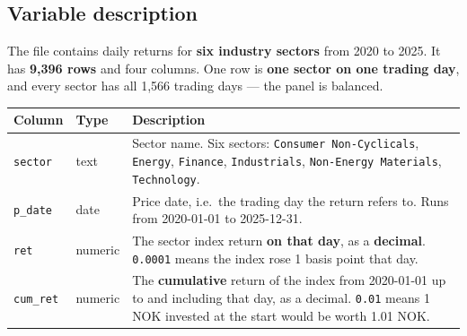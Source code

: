 \documentclass[
  12pt,
  letterpaper,
]{scrbook}
\newenvironment{Shaded}{\begin{snugshade}}{\end{snugshade}}
\newcommand{\AttributeTok}[1]{\textcolor[rgb]{0.40,0.45,0.13}{#1}}
\newcommand{\CommentTok}[1]{\textcolor[rgb]{0.37,0.37,0.37}{#1}}
\newcommand{\ConstantTok}[1]{\textcolor[rgb]{0.56,0.35,0.01}{#1}}
\newcommand{\DecValTok}[1]{\textcolor[rgb]{0.68,0.00,0.00}{#1}}
\newcommand{\FunctionTok}[1]{\textcolor[rgb]{0.28,0.35,0.67}{#1}}
\newcommand{\NormalTok}[1]{\textcolor[rgb]{0.00,0.23,0.31}{#1}}
\newcommand{\OtherTok}[1]{\textcolor[rgb]{0.00,0.23,0.31}{#1}}
\newcommand{\SpecialCharTok}[1]{\textcolor[rgb]{0.37,0.37,0.37}{#1}}
\newcommand{\StringTok}[1]{\textcolor[rgb]{0.13,0.47,0.30}{#1}}
\theoremstyle{plain}
\theoremstyle{definition}
\theoremstyle{remark}
\begin{document}
\begin{Shaded}
\end{Shaded}

\subsection{Variable description}\label{variable-description}

The file contains daily returns for \textbf{six industry sectors} from
2020 to 2025. It has \textbf{9,396 rows} and four columns. One row is
\textbf{one sector on one trading day}, and every sector has all 1,566
trading days --- the panel is balanced.

\begin{longtable}[]{@{}
  >{\raggedright\arraybackslash}p{}
  >{\raggedright\arraybackslash}p{}
  >{\raggedright\arraybackslash}p{}@{}}
\toprule\noalign{}
\begin{minipage}[b]{\linewidth}\raggedright
Column
\end{minipage} & \begin{minipage}[b]{\linewidth}\raggedright
Type
\end{minipage} & \begin{minipage}[b]{\linewidth}\raggedright
Description
\end{minipage} \\
\midrule\noalign{}
\endhead
\bottomrule\noalign{}
\endlastfoot
\texttt{sector} & text & Sector name. Six sectors:
\texttt{Consumer\ Non-Cyclicals}, \texttt{Energy}, \texttt{Finance},
\texttt{Industrials}, \texttt{Non-Energy\ Materials},
\texttt{Technology}. \\
\texttt{p\_date} & date & Price date, i.e.~the trading day the return
refers to. Runs from 2020-01-01 to 2025-12-31. \\
\texttt{ret} & numeric & The sector index return \textbf{on that day},
as a \textbf{decimal}. \texttt{0.0001} means the index rose 1 basis
point that day. \\
\texttt{cum\_ret} & numeric & The \textbf{cumulative} return of the
index from 2020-01-01 up to and including that day, as a decimal.
\texttt{0.01} means 1 NOK invested at the start would be worth 1.01
NOK. \\
\end{longtable}
\end{document}
